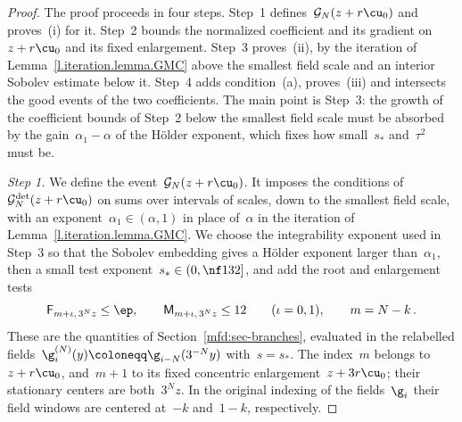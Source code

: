 \documentclass[11pt]{amsart}
\begin{document}
\begin{proof}
The proof proceeds in four steps. Step~1 defines~$\mathcal G_N(z+r\cu_0)$ and proves~(i) for it. Step~2 bounds the normalized coefficient and its gradient on~$z+r\cu_0$ and its fixed enlargement. Step~3 proves~(ii), by the iteration of Lemma~\ref{l.iteration.lemma.GMC} above the smallest field scale and an interior Sobolev estimate below it. Step~4 adds condition~(a), proves~(iii) and intersects the good events of the two coefficients. The main point is Step~3: the growth of the coefficient bounds of Step~2 below the smallest field scale must be absorbed by the gain~$\alpha_1-\alpha$ of the H\"older exponent, which fixes how small~$s_*$ and~$\tau^2$ must be.

\smallskip

\emph{Step 1.} We define the event~$\mathcal G_N(z+r\cu_0)$. It imposes the conditions of~$\mathcal G_N^{\rm det}(z+r\cu_0)$ on sums over intervals of scales, down to the smallest field scale, with an exponent~$\alpha_1\in(\alpha,1)$ in place of~$\alpha$ in the iteration of Lemma~\ref{l.iteration.lemma.GMC}. We choose the integrability exponent used in Step~3 so that the Sobolev embedding gives a H\"older exponent larger than~$\alpha_1$, then a small test exponent~$s_*\in(0,\nf1{32}]$, and add the root and enlargement tests
\begin{equation*}
	\mathsf F_{m+\iota,\,3^Nz}\leq\ep,\qquad
	\mathsf M_{m+\iota,\,3^Nz}\leq12
	\qquad(\iota=0,1),\qquad m=N-k\,.
\end{equation*}
These are the quantities of Section~\ref{mfd:sec-branches}, evaluated in the relabelled fields~$\g_i^{(N)}(y)\coloneqq\g_{i-N}(3^{-N}y)$ with~$s=s_*$. The index~$m$ belongs to~$z+r\cu_0$, and~$m+1$ to its fixed concentric enlargement~$z+3r\cu_0$; their stationary centers are both~$3^Nz$. In the original indexing of the fields~$\g_i$ their field windows are centered at~$-k$ and~$1-k$, respectively.

\smallskip


\end{proof}
\end{document}
